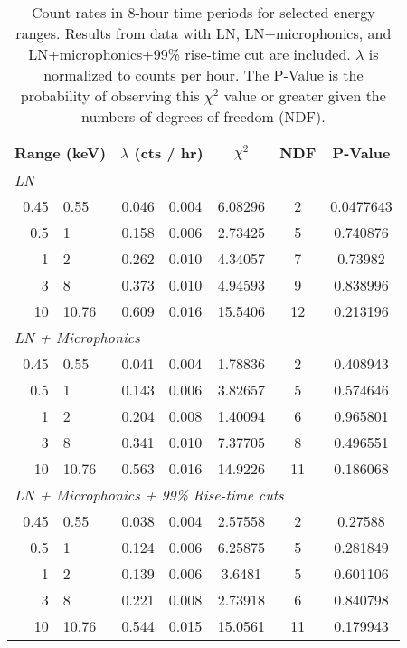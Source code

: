 			\begin{table}
				\centering
				\begin{tabular}{r@{$~\to~$}l r@{$~\pm~$}l  c  c  c} 
					\toprule 				
					\multicolumn{2}{c}{Range (keV)} & \multicolumn{2}{c}{$\lambda$ (cts / hr)} & $\chi^2$ & NDF & P-Value \\
					\midrule
					\multicolumn{7}{l}{\emph{LN}} \\
					0.45 & 0.55 & 0.046 & 0.004 & 6.08296 & 2 & 0.0477643 \\
					0.5 & 1 & 0.158 & 0.006 & 2.73425 & 5 & 0.740876 \\
					1 & 2 & 0.262 & 0.010 & 4.34057 & 7 & 0.73982 \\
					3 & 8 & 0.373 & 0.010 & 4.94593 & 9 & 0.838996 \\
					10 & 10.76 & 0.609 & 0.016 & 15.5406 & 12 & 0.213196 \\
					\midrule
					\multicolumn{7}{l}{\emph{LN + Microphonics}} \\
					0.45 & 0.55 & 0.041 & 0.004 & 1.78836 & 2 & 0.408943 \\
					0.5 & 1 & 0.143 & 0.006 & 3.82657 & 5 & 0.574646 \\
					1 & 2 & 0.204 & 0.008 & 1.40094 & 6 & 0.965801 \\
					3 & 8 & 0.341 & 0.010 & 7.37705 & 8 & 0.496551 \\
					10 & 10.76 & 0.563 & 0.016 & 14.9226 & 11 & 0.186068 \\
					\midrule					
					\multicolumn{7}{l}{\emph{LN + Microphonics + 99\% Rise-time cuts}} \\
					0.45 & 0.55 & 0.038 & 0.004 & 2.57558 & 2 & 0.27588 \\
					0.5 & 1 & 0.124 & 0.006 & 6.25875 & 5 & 0.281849 \\
					1 & 2 & 0.139 & 0.006 & 3.6481 & 5 & 0.601106 \\
					3 & 8 & 0.221 & 0.008 & 2.73918 & 6 & 0.840798 \\
					10 & 10.76 & 0.544 & 0.015 & 15.0561 & 11 & 0.179943 \\
					\bottomrule
				\end{tabular}
				\caption[Count rates in 8-hour time periods for selected energy ranges]
				{Count rates in 8-hour time periods for selected energy ranges.  Results from data with LN, LN+microphonics, and LN+microphonics+99\% 
				rise-time cut are included.  $\lambda$ is normalized to counts per hour.  The P-Value is the probability of observing this $\chi^{2}$ value or greater
				given the numbers-of-degrees-of-freedom (NDF).}
				\label{tab:BeGeFitRates}
			\end{table}

